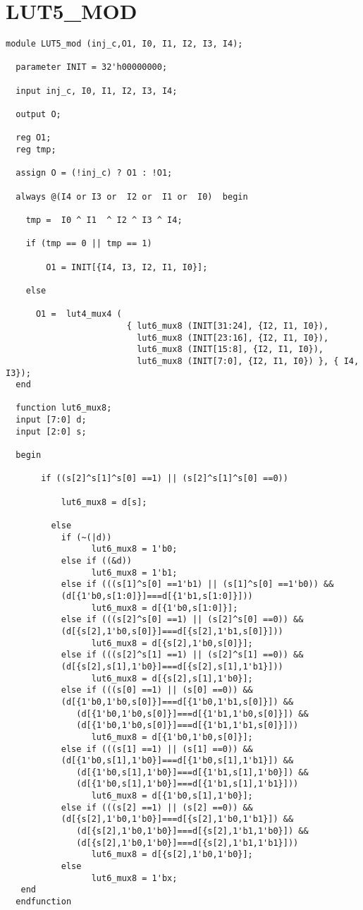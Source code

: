 \section{LUT5\_MOD}
\begin{lstlisting}
module LUT5_mod (inj_c,O1, I0, I1, I2, I3, I4);

  parameter INIT = 32'h00000000;

  input inj_c, I0, I1, I2, I3, I4;

  output O;

  reg O1;
  reg tmp;
  
  assign O = (!inj_c) ? O1 : !O1;

  always @(I4 or I3 or  I2 or  I1 or  I0)  begin
 
    tmp =  I0 ^ I1  ^ I2 ^ I3 ^ I4;

    if (tmp == 0 || tmp == 1)

        O1 = INIT[{I4, I3, I2, I1, I0}];

    else 
    
      O1 =  lut4_mux4 (
                        { lut6_mux8 (INIT[31:24], {I2, I1, I0}),
                          lut6_mux8 (INIT[23:16], {I2, I1, I0}),
                          lut6_mux8 (INIT[15:8], {I2, I1, I0}),
                          lut6_mux8 (INIT[7:0], {I2, I1, I0}) }, { I4, I3});
  end

  function lut6_mux8;
  input [7:0] d;
  input [2:0] s;
   
  begin

       if ((s[2]^s[1]^s[0] ==1) || (s[2]^s[1]^s[0] ==0))
           
           lut6_mux8 = d[s];

         else
           if (~(|d))
                 lut6_mux8 = 1'b0;
           else if ((&d))
                 lut6_mux8 = 1'b1;
           else if (((s[1]^s[0] ==1'b1) || (s[1]^s[0] ==1'b0)) &&
           (d[{1'b0,s[1:0]}]===d[{1'b1,s[1:0]}]))
                 lut6_mux8 = d[{1'b0,s[1:0]}];
           else if (((s[2]^s[0] ==1) || (s[2]^s[0] ==0)) && 
           (d[{s[2],1'b0,s[0]}]===d[{s[2],1'b1,s[0]}]))
                 lut6_mux8 = d[{s[2],1'b0,s[0]}];
           else if (((s[2]^s[1] ==1) || (s[2]^s[1] ==0)) && 
           (d[{s[2],s[1],1'b0}]===d[{s[2],s[1],1'b1}]))
                 lut6_mux8 = d[{s[2],s[1],1'b0}];
           else if (((s[0] ==1) || (s[0] ==0)) && 
           (d[{1'b0,1'b0,s[0]}]===d[{1'b0,1'b1,s[0]}]) &&
              (d[{1'b0,1'b0,s[0]}]===d[{1'b1,1'b0,s[0]}]) && 
              (d[{1'b0,1'b0,s[0]}]===d[{1'b1,1'b1,s[0]}]))
                 lut6_mux8 = d[{1'b0,1'b0,s[0]}];
           else if (((s[1] ==1) || (s[1] ==0)) && 
           (d[{1'b0,s[1],1'b0}]===d[{1'b0,s[1],1'b1}]) &&
              (d[{1'b0,s[1],1'b0}]===d[{1'b1,s[1],1'b0}]) && 
              (d[{1'b0,s[1],1'b0}]===d[{1'b1,s[1],1'b1}]))
                 lut6_mux8 = d[{1'b0,s[1],1'b0}];
           else if (((s[2] ==1) || (s[2] ==0)) &&
           (d[{s[2],1'b0,1'b0}]===d[{s[2],1'b0,1'b1}]) &&
              (d[{s[2],1'b0,1'b0}]===d[{s[2],1'b1,1'b0}]) &&
              (d[{s[2],1'b0,1'b0}]===d[{s[2],1'b1,1'b1}]))
                 lut6_mux8 = d[{s[2],1'b0,1'b0}];
           else
                 lut6_mux8 = 1'bx;
   end
  endfunction



\end{lstlisting}
